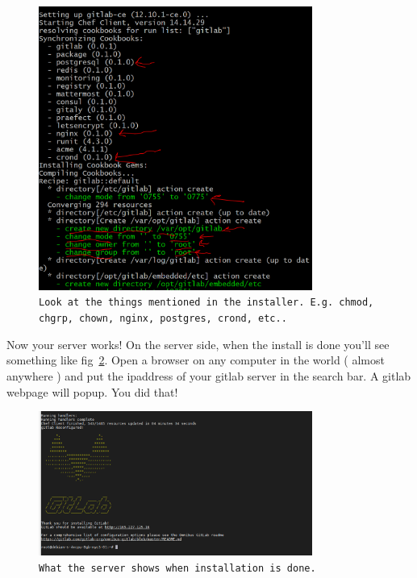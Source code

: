 \documentclass[10pt]{article}
\begin{document}
\begin{figure}[h]
\centering
	\includegraphics[width=0.8\textwidth]{Images/forClass.PNG}
	\caption{{\small \texttt{Look at the things mentioned in the installer. E.g.
chmod, chgrp, chown, nginx, postgres, crond, etc..}}}
	\label{fig:familiar}
\end{figure}

Now your server works! On the server side, when the install is done you'll see
something like fig~\ref{fig:installDone}. Open a browser on any computer in the world ( almost
anywhere ) and put the ipaddress of your gitlab server in the search bar. A
gitlab webpage will popup. You did that! 

\begin{figure}[h]
\centering
	\includegraphics[width=0.8\textwidth]{Images/installDone.PNG}
	\caption{{\small \texttt{What the server shows when installation is done.}}}
	\label{fig:installDone}
\end{figure}
\end{document}
